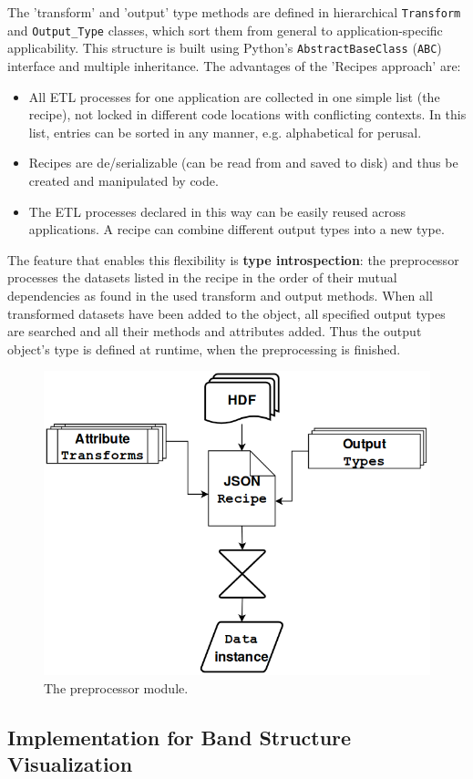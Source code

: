 The 'transform' and 'output' type methods are defined in hierarchical
\texttt{Transform} and \texttt{Output\_Type} classes, which sort them from
general to application-specific applicability. This structure is built using
Python's \texttt{AbstractBaseClass} (\texttt{ABC}) interface and multiple
inheritance. The advantages of the 'Recipes approach' are:
\begin{itemize}
\item All ETL processes for one application are collected in one simple list
    (the recipe), not locked in different code locations with conflicting
    contexts. In this list, entries can be sorted in any manner, e.g.
    alphabetical for perusal.
\item Recipes are de/serializable (can be read from and saved to disk) and thus be
    created and manipulated by code.
\item The ETL processes declared in this way can be easily reused across
    applications. A recipe can combine different output types into a new type.
\end{itemize}

The feature that enables this flexibility is \textbf{type introspection}: the
preprocessor processes the datasets listed in the recipe in the order of their
mutual dependencies as found in the used transform and output methods. When all
transformed datasets have been added to the object, all specified output types
are searched and all their methods and attributes added. Thus the output
object's type is defined at runtime, when the preprocessing is finished.

\begin{figure}[htb!]
    \centering
    \includegraphics[width=0.6\linewidth]{img/reader_flowchart4.png}
    \caption{The preprocessor module.}
    \label{fig:preprocessor}
\end{figure}

\subsection{Implementation for Band Structure Visualization}
\label{sec:preprocessor-implementation}

